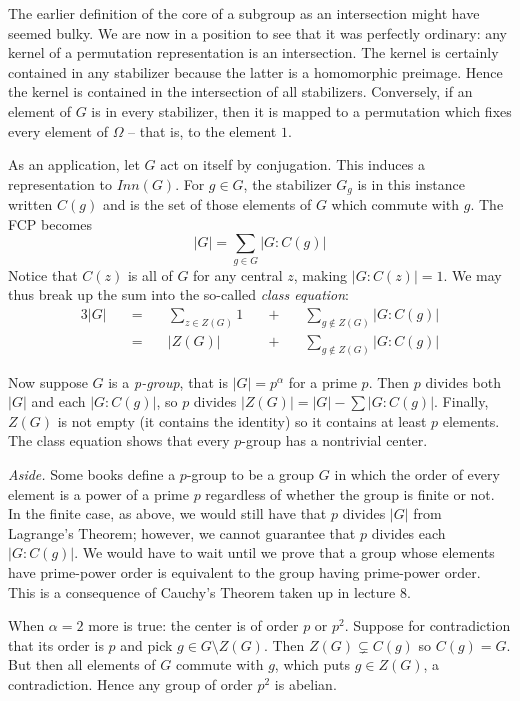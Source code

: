 \documentclass[letterpaper]{article}
\begin{document}
The earlier definition of the core of a subgroup as an intersection
might have seemed bulky. We are now in a position to see that it
was perfectly ordinary: any kernel of a permutation representation
is an intersection. The kernel is certainly contained in any
stabilizer because the latter is a homomorphic preimage. Hence the
kernel is contained in the intersection of all stabilizers. Conversely,
if an element of $G$ is in every stabilizer, then it is mapped to
a permutation which fixes every element of $\Omega$ -- that is, to
the element $1$.

As an application, let $G$ act on itself by conjugation. This induces
a representation to $Inn(G)$. For $g \in G$, the stabilizer $G_g$
is in this instance written $C(g)$ and is the set of those elements
of $G$ which commute with $g$. The FCP becomes
\[|G| = \sum_{g \in G} |G \colon C(g)|\]
Notice that $C(z)$ is all of $G$ for any central $z$, making $|G
\colon C(z)| = 1$. We may thus break up the sum into the so-called
\emph{class equation}:
\begin{alignat*}{3}
|G| \quad &=& \quad \sum_{z \in Z(G)} 1 \quad &+& \quad \sum_{g \not \in Z(G)} |G \colon C(g)| \\
    &=& \quad |Z(G)|              \quad &+& \quad \sum_{g \not \in Z(G)} |G \colon C(g)|
\end{alignat*}

Now suppose $G$ is a \emph{\emph{p}-group}, that is $|G| = p^\alpha$
for a prime $p$. Then $p$ divides both $|G|$ and each $|G \colon
C(g)|$, so $p$ divides $|Z(G)| = |G| - \sum |G \colon C(g)|$.
Finally, $Z(G)$ is not empty (it contains the identity) so it
contains at least $p$ elements. The class equation shows that every
$p$-group has a nontrivial center.

\textit{Aside.} Some books define a $p$-group to be a group $G$ in
which the order of every element is a power of a prime $p$ regardless
of whether the group is finite or not. In the finite case, as above,
we would still have that $p$ divides $|G|$ from Lagrange's Theorem;
however, we cannot guarantee that $p$ divides each $|G \colon C(g)|$.
We would have to wait until we prove that a group whose elements
have prime-power order is equivalent to the group having prime-power
order. This is a consequence of Cauchy's Theorem taken up in lecture
8.

When $\alpha = 2$ more is true: the center is of order $p$ or $p^2$.
Suppose for contradiction that its order is $p$ and pick $g \in G
\setminus Z(G)$. Then $Z(G) \subsetneq C(g)$ so $C(g) = G$. But
then all elements of $G$ commute with $g$, which puts $g \in Z(G)$,
a contradiction. Hence any group of order $p^2$ is abelian.
\end{document}
